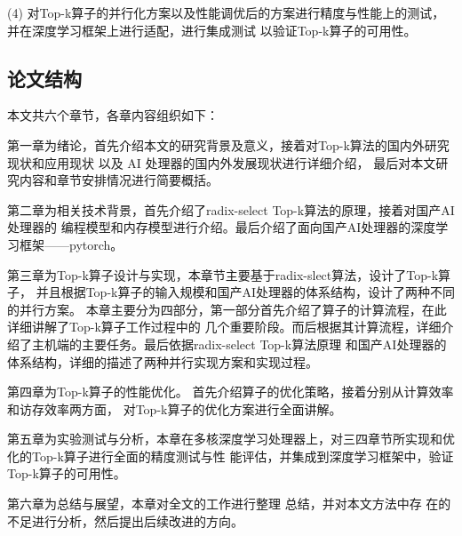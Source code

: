 (4) 对Top-k算子的并行化方案以及性能调优后的方案进行精度与性能上的测试，并在深度学习框架上进行适配，进行集成测试
以验证Top-k算子的可用性。

\subsection{论文结构}

本文共六个章节，各章内容组织如下： 

第一章为绪论，首先介绍本文的研究背景及意义，接着对Top-k算法的国内外研究现状和应用现状
以及 AI 处理器的国内外发展现状进行详细介绍，
最后对本文研究内容和章节安排情况进行简要概括。

第二章为相关技术背景，首先介绍了radix-select Top-k算法的原理，接着对国产AI处理器的
编程模型和内存模型进行介绍。最后介绍了面向国产AI处理器的深度学习框架——pytorch。


第三章为Top-k算子设计与实现，本章节主要基于radix-slect算法，设计了Top-k算子，
并且根据Top-k算子的输入规模和国产AI处理器的体系结构，设计了两种不同的并行方案。
本章主要分为四部分，第一部分首先介绍了算子的计算流程，在此详细讲解了Top-k算子工作过程中的
几个重要阶段。而后根据其计算流程，详细介绍了主机端的主要任务。最后依据radix-select Top-k算法原理
和国产AI处理器的体系结构，详细的描述了两种并行实现方案和实现过程。

第四章为Top-k算子的性能优化。
首先介绍算子的优化策略，接着分别从计算效率和访存效率两方面，
对Top-k算子的优化方案进行全面讲解。
 
 第五章为实验测试与分析，本章在多核深度学习处理器上，对三四章节所实现和优化的Top-k算子进行全面的精度测试与性
 能评估，并集成到深度学习框架中，验证Top-k算子的可用性。 
 
 第六章为总结与展望，本章对全文的工作进行整理
 总结，并对本文方法中存 在的不足进行分析，然后提出后续改进的方向。
